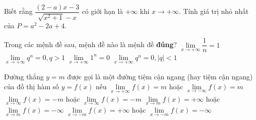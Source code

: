\begin{ex}%
	Biết rằng $\dfrac{(2-a)x-3}{\sqrt{x^2+1}-x}$ có giới hạn là $+\infty $ khi $x\to +\infty $. Tính giá trị nhỏ  nhất của $P=a^2-2a+4$.
\end{ex}


\begin{ex}%
	Trong các mệnh đề sau, mệnh đề nào là mệnh đề  \textbf{đúng}?
	\choice 
		 {$\lim\limits_{x\to+\infty} \dfrac{1}{n}=1$}
		{$\lim\limits_{x\to+\infty} q^n=0,  q>1$}
		 {$\lim\limits_{x\to+\infty} 1^n=0$}
		{\True  $\lim\limits_{x\to+\infty} q^n=0,|q|<1$}
\end{ex}

\begin{ex}%
	Đường thẳng $ y = m $  được gọi là một đường tiệm cận ngang (hay tiệm cận ngang) của đồ thị hàm số $y = f (x)$ nếu
	 \choice
		{\True $\lim\limits_{x \to +\infty} f(x) = m$ hoặc $\lim\limits_{x  \to -\infty }f(x) = m$}
		{$\lim\limits_{x  \to \infty} f(x) = -m $ hoặc $\lim\limits_{x \to \infty }f(x) = -m $}
		{$\lim\limits_{x \to m} f(x)= +\infty$ hoặc $\lim\limits_{x \to  m }f(x) = -\infty $}
		{$\lim\limits_{x \to -m}  f(x) = +\infty$ hoặc $\lim\limits_{x \to -m} f(x) = -\infty $}
\end{ex}

